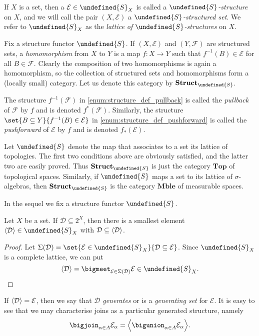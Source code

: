\documentclass[article, a4paper, 11pt, oneside]{memoir}
\let\mathfrak\undefined
\numberwithin{equation}{chapter}
\newcommand{\calE}{\mathcal{E}}
\newcommand{\calD}{\mathcal{D}}
\newcommand{\calF}{\mathcal{F}}
\newcommand{\strucS}{\mathfrak{S}}
\DeclarePairedDelimiter{\gen}{\langle}{\rangle} %
\newcommand{\powerset}[1]{2^{#1}}
\newcommand{\ncat}[1]{\mathbf{#1}} %
\newcommand{\catTop}{\ncat{Top}} %
\newcommand{\catMble}{\ncat{Mble}} %
\newcommand{\catStruc}[1]{\ncat{Struct}_{#1}} %
\newcommand{\catStrucS}{\catStruc{\strucS}} %
\begin{document}
If $X$ is a set, then a $\calE \in \strucS_X$ is called a \emph{$\strucS$-structure} on $X$, and we will call the pair $(X, \calE)$ a \emph{$\strucS$-structured set}. We refer to $\strucS_X$ as the \emph{lattice of $\strucS$-structures} on $X$.

Fix a structure functor $\strucS$. If $(X, \calE)$ and $(Y, \calF)$ are structured sets, a \emph{homomorphism} from $X$ to $Y$ is a map $f \colon X \to Y$ such that $f^{-1}(B) \in \calE$ for all $B \in \calF$. Clearly the composition of two homomorphisms is again a homomorphism, so the collection of structured sets and homomorphisms form a (locally small) category. Let us denote this category by $\catStrucS$.

The structure $f^{-1}(\calF)$ in \cref{enum:structure_def_pullback} is called the \emph{pullback} of $\calF$ by $f$ and is denoted $f^*(\calF)$. Similarly, the structure $\set{B \subseteq Y}{f^{-1}(B) \in \calE}$ in \cref{enum:structure_def_pushforward} is called the \emph{pushforward} of $\calE$ by $f$ and is denoted $f_*(\calE)$.

\begin{example}
    Let $\strucS$ denote the map that associates to a set its lattice of topologies. The first two conditions above are obviously satisfied, and the latter two are easily proved. Thus $\catStrucS$ is just the category $\catTop$ of topological spaces. Similarly, if $\strucS$ maps a set to its lattice of $\sigma$-algebras, then $\catStrucS$ is the category $\catMble$ of measurable spaces.
\end{example}

In the sequel we fix a structure functor $\strucS$.

\begin{lemma}
    Let $X$ be a set. If $\calD \subseteq \powerset{X}$, then there is a smallest element $\gen{\calD} \in \strucS_X$ with $\calD \subseteq \gen{\calD}$.
\end{lemma}

\begin{proof}
    Let $\Sigma(\calD) = \set{\calE \in \strucS_X}{\calD \subseteq \calE}$. Since $\strucS_X$ is a complete lattice, we can put
    \begin{equation*}
        \gen{\calD} = \bigmeet_{\calE \in \Sigma(\calD)} \calE \in \strucS_X.
    \end{equation*}
\end{proof}
%
If $\gen{\calD} = \calE$, then we say that $\calD$ \emph{generates} or is a \emph{generating set} for $\calE$. It is easy to see that we may characterise joins as a particular generated structure, namely
%
\begin{equation}
    \label{eq:join_as_generated_structure}
    \bigjoin_{\alpha \in A} \calE_\alpha
        = \gen[\Big]{ \bigunion_{\alpha \in A} \calE_\alpha }.
\end{equation}
\end{document}
